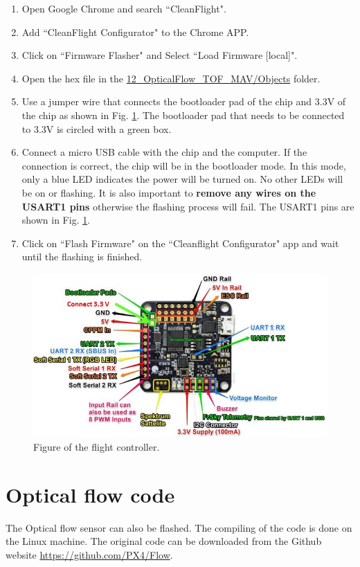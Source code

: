 \documentclass[idxtotoc,hyperref,openany]{labbook} %
\begin{document}
\begin{enumerate}
\item Open Google Chrome and search ``CleanFlight".
\item Add ``CleanFlight Configurator" to the Chrome APP.
\item Click on ``Firmware Flasher" and Select ``Load Firmware [local]".
\item Open the hex file in the \url{12_OpticalFlow_TOF_MAV/Objects} folder.
\item Use a jumper wire that connects the bootloader pad of the chip and 3.3V of the chip as shown in Fig. \ref{fig_flightcontroller}. The bootloader pad that needs to be connected to 3.3V is circled with a green box. 
\item Connect a micro USB cable with the chip and the computer. If the connection is correct, the chip will be in the bootloader mode. In this mode, only a blue LED indicates the power will be turned on. No other LEDs will be on or flashing. It is also important to \textbf{remove any wires on the USART1 pins} otherwise the flashing process will fail. The USART1 pins are shown in Fig. \ref{fig_flightcontroller}. 
\item Click on ``Flash Firmware" on the ``Cleanflight Configurator" app and wait until the flashing is finished.
\end{enumerate}

\begin{figure}
\centering
\includegraphics[scale=1]{./Figure/fig_flightcontroller}
\caption{Figure of the flight controller. }\label{fig_flightcontroller}
\end{figure}

\section{Optical flow code}
The Optical flow sensor can also be flashed. The compiling of the code is done on the Linux machine. The original code can be downloaded from the Github website \url{https://github.com/PX4/Flow}.
\end{document}
